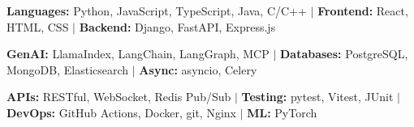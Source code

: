 %
  \item\small{\textbf{Languages:} Python, JavaScript, TypeScript, Java, C/C++ $|$ \textbf{Frontend:} React, HTML, CSS $|$ \textbf{Backend:} Django, FastAPI, Express.js}
  \item\small{\textbf{GenAI:} LlamaIndex, LangChain, LangGraph, MCP $|$ \textbf{Databases:} PostgreSQL, MongoDB, Elasticsearch $|$ \textbf{Async:} asyncio, Celery}
  \item\small{\textbf{APIs:} RESTful, WebSocket, Redis Pub/Sub $|$ \textbf{Testing:} pytest, Vitest, JUnit $|$ \textbf{DevOps:} GitHub Actions, Docker, git, Nginx $|$ \textbf{ML:} PyTorch}%
